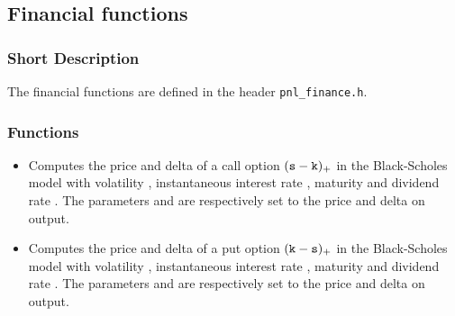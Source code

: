
\subsection{Financial functions}
\subsubsection{Short Description}

The financial functions are defined in the header \verb!pnl_finance.h!.\\

\subsubsection{Functions}


\begin{itemize}
\item
  \sshortdescribe Computes the price and delta of a call option $({\tt s} -
  {\tt k})_+$ in the Black-Scholes model with volatility ,
  instantaneous interest rate , maturity  and dividend rate
  . The parameters  and  are respectively
  set to the price and delta on output.

\item
  \sshortdescribe Computes the price and delta of a put option $({\tt k} - 
  {\tt s})_+$ in the Black-Scholes model with volatility ,
  instantaneous interest rate , maturity  and dividend rate
  .  The parameters  and  are respectively
  set to the price and delta on output.

\end{itemize}


